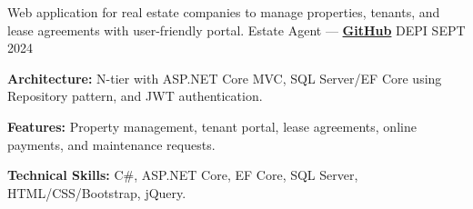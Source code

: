 \begin{cventries}
\cventry
    {Web application for real estate companies to manage properties, tenants, and lease agreements with user-friendly portal.} %
    {Estate Agent — \href{https://github.com/ibrhmahmd/RealEstate}{\color{midnightblue}\textbf{GitHub}} \textrm{\faArrowRight}} %
    {DEPI} %
    {SEPT 2024} %
    {
      \begin{cvitems} %
        \item \textbf{Architecture:}{ N-tier with ASP.NET Core MVC, SQL Server/EF Core using Repository pattern, and JWT authentication.}
        \item \textbf{Features:}{ Property management, tenant portal, lease agreements, online payments, and maintenance requests.}
        \item \textbf{Technical Skills:}{ C\#, ASP.NET Core, EF Core, SQL Server, HTML/CSS/Bootstrap, jQuery.}
      \end{cvitems}
    }





\end{cventries}
